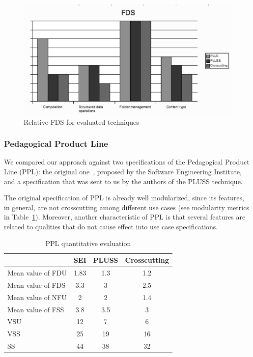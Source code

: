 \documentclass{acm_proc_article-sp}
\begin{document}
 \begin{figure}[htb]
 \begin{center}
  \includegraphics[scale=0.42]{img/fds-mms.eps}
  \caption{Relative FDS for evaluated techniques}
  \label{fig:fds-mms}
  \end{center}
\end{figure}

\subsubsection{Pedagogical Product Line}

We compared our approach against two specifications of the Pedagogical Product Line (PPL): the original one~\cite{ppl-url}, proposed by the Software Engineering Institute, and a specification that was sent to us by the authors of the PLUSS technique. 

The original specification of PPL is already well modularized, since its features, in general, are not crosscutting among different use cases (see modularity metrics in Table~\ref{tab:ppl-metrics}). Moreover, another characteristic of PPL is that several features are related to qualities that do not cause effect into use case specifications. 

\begin{table}[hb]
\centering
\caption{PPL quantitative evaluation}
\label{tab:ppl-metrics}
\begin{small}
\begin{tabular}{lccc} \hline
					& SEI 	& PLUSS 	& Crosscutting	\\ \hline
Mean value of FDU 		& 1.83	& 1.3	& 1.2	\\
Mean value of FDS 		& 3.3	& 3		& 2.5	\\
Mean value of NFU 		& 2		& 2		& 1.4	\\
Mean value of FSS 		& 3.8	& 3.5	& 3		\\ 
VSU 					& 12		& 7		& 6		\\
VSS 					& 25		& 19		& 16		\\
SS 					& 44		& 38		& 32		\\	\hline
\end{tabular}
\end{small}
\end{table}
\end{document}
